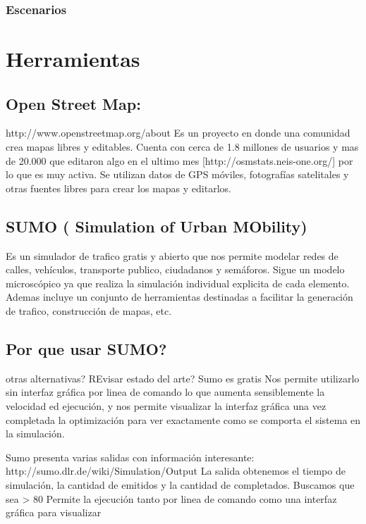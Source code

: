 \subsubsection{Escenarios}



\section{Herramientas}

\subsection{Open Street Map:} 
http://www.openstreetmap.org/about  Es un proyecto en donde una comunidad crea mapas libres y editables. Cuenta con cerca de 1.8 millones de usuarios  y  mas de 20.000 que editaron algo en el ultimo mes [http://osmstats.neis-one.org/] por lo que es muy activa. Se utilizan datos de GPS móviles, fotografías satelitales y otras fuentes libres para crear los mapas y editarlos. 

\subsection{SUMO ( Simulation of Urban MObility)}
Es un simulador de trafico gratis y abierto que nos permite modelar redes de calles, vehículos, transporte publico, ciudadanos y semáforos. Sigue un modelo microscópico ya que realiza la simulación individual explicita de cada elemento. Ademas incluye un conjunto de herramientas destinadas  a facilitar la generación de trafico, construcción de mapas, etc. 


\subsection{Por que usar SUMO? }
otras alternativas? REvisar estado del arte?
Sumo es gratis
Nos permite utilizarlo sin interfaz gráfica por linea de comando lo que aumenta sensiblemente la velocidad ed ejecución, y  nos permite visualizar la interfaz gráfica una vez completada la optimización para ver exactamente como se comporta el sistema en la simulación.

Sumo presenta varias salidas con información interesante: http://sumo.dlr.de/wiki/Simulation/Output 
La salida obtenemos el tiempo de simulación, la cantidad de emitidos y la cantidad de completados. Buscamos que sea > 80%
Permite la ejecución tanto por linea de comando como una interfaz gráfica para visualizar

